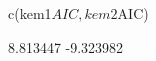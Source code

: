 \begin{Schunk}
\begin{Sinput}
 c(kem1$AIC, kem2$AIC)
\end{Sinput}
\begin{Soutput}
[1]  8.813447 -9.323982
\end{Soutput}
\end{Schunk}
